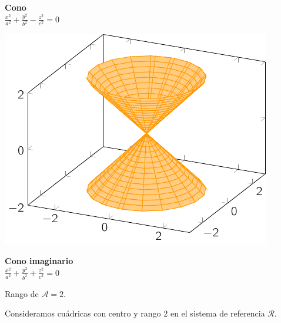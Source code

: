 \documentclass[11pt, a4paper]{article}
\newif\IfInSansMode
\theoremstyle{theorem-style}
\theoremstyle{definition-style}
\theoremstyle{remark-style}
\theoremstyle{example-style}
\begin{document}
\begin{minipage}[c]{0.45\textwidth}
  {\bf Cono}\vspace{1em}\\
  $\displaystyle \frac{{x}^2}{a^2} + \frac{{y}^2}{b^2}-\frac{{z}^2}{c^2} = 0$
\end{minipage}\hfill
\begin{minipage}[]{0.45\textwidth}
\includegraphics{./img/cono.pdf}
\end{minipage}

\begin{minipage}[c]{0.45\textwidth}
  {\bf Cono imaginario}\vspace{1em}\\
  $\displaystyle \frac{{x}^2}{a^2} + \frac{{y}^2}{b^2}+\frac{{z}^2}{c^2}=0$
\end{minipage}\hfill
\begin{minipage}[]{0.45\textwidth}
\hfill
\end{minipage}

\vspace{1em}

Rango de $\mathcal A = 2$.

Consideramos cuádricas con centro y rango $2$ en el sistema de referencia $\mathcal R$.

\vspace{1em}
\end{document}
